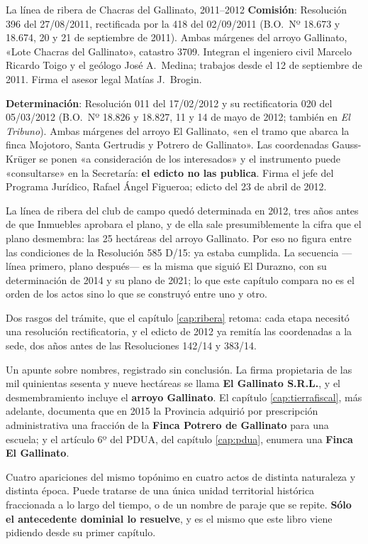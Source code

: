 \begin{ficha}{La línea de ribera de Chacras del Gallinato, 2011--2012}
\textbf{Comisión}: Resolución 396 del 27/08/2011, rectificada por la 418 del 02/09/2011 (B.O.\ Nº 18.673 y 18.674, 20 y 21 de septiembre de 2011). Ambas márgenes del arroyo Gallinato, «Lote Chacras del Gallinato», catastro 3709. Integran el ingeniero civil Marcelo Ricardo Toigo y el geólogo José A.\ Medina; trabajos desde el 12 de septiembre de 2011. Firma el asesor legal Matías J.\ Brogin.

\textbf{Determinación}: Resolución 011 del 17/02/2012 y su rectificatoria 020 del 05/03/2012 (B.O.\ Nº 18.826 y 18.827, 11 y 14 de mayo de 2012; también en \textit{El Tribuno}). Ambas márgenes del arroyo El Gallinato, «en el tramo que abarca la finca Mojotoro, Santa Gertrudis y Potrero de Gallinato». Las coordenadas Gauss-Krüger se ponen «a consideración de los interesados» y el instrumento puede «consultarse» en la Secretaría: \textbf{el edicto no las publica}. Firma el jefe del Programa Jurídico, Rafael Ángel Figueroa; edicto del 23 de abril de 2012.
\end{ficha}

\begin{cautela}
La línea de ribera del club de campo quedó determinada en 2012, tres años antes de que Inmuebles aprobara el plano, y de ella sale presumiblemente la cifra que el plano desmembra: las 25 hectáreas del arroyo Gallinato. Por eso no figura entre las condiciones de la Resolución 585 D/15: ya estaba cumplida.  La secuencia ---línea primero, plano después--- es la misma que siguió El Durazno, con su determinación de 2014 y su plano de 2021; lo que este capítulo compara no es el orden de los actos sino lo que se construyó entre uno y otro.

Dos rasgos del trámite, que el capítulo \ref{cap:ribera} retoma: cada etapa necesitó una resolución rectificatoria, y el edicto de 2012 ya remitía las coordenadas a la sede, dos años antes de las Resoluciones 142/14 y 383/14.
\end{cautela}

\begin{cautela}
Un apunte sobre nombres, registrado sin conclusión. La firma propietaria de las mil quinientas sesenta y nueve hectáreas se llama \textbf{El Gallinato S.R.L.}, y el desmembramiento incluye el \textbf{arroyo Gallinato}. El capítulo \ref{cap:tierrafiscal}, más adelante, documenta que en 2015 la Provincia adquirió por prescripción administrativa una fracción de la \textbf{Finca Potrero de Gallinato} para una escuela; y el artículo 6º del PDUA, del capítulo \ref{cap:pdua}, enumera una \textbf{Finca El Gallinato}.

Cuatro apariciones del mismo topónimo en cuatro actos de distinta naturaleza y distinta época. Puede tratarse de una única unidad territorial histórica fraccionada a lo largo del tiempo, o de un nombre de paraje que se repite. \textbf{Sólo el antecedente dominial lo resuelve}, y es el mismo que este libro viene pidiendo desde su primer capítulo.
\end{cautela}

